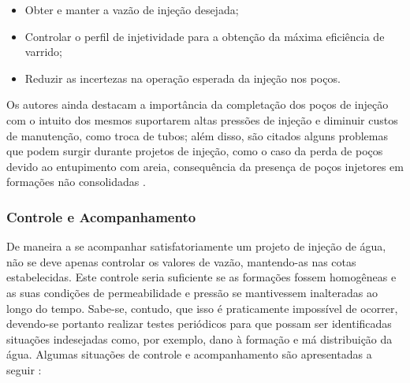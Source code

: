 \begin{itemize}
	\item Obter e manter a vaz\~{a}o de inje\c{c}\~{a}o desejada;
	\item Controlar o perfil de injetividade para a obten\c{c}\~{a}o da m\'{a}xima efici\^{e}ncia de varrido;
	\item Reduzir as incertezas na opera\c{c}\~{a}o esperada da inje\c{c}\~{a}o nos po\c{c}os.
\end{itemize}

Os autores ainda destacam a import\^{a}ncia da completa\c{c}\~{a}o dos po\c{c}os de inje\c{c}\~{a}o com o intuito dos mesmos suportarem altas press\~{o}es de inje\c{c}\~{a}o e diminuir custos de manuten\c{c}\~{a}o, como troca de tubos; al\'{e}m disso, s\~{a}o citados alguns problemas que podem surgir durante projetos de inje\c{c}\~{a}o, como o caso da perda de po\c{c}os devido ao entupimento com areia, consequ\^{e}ncia da presen\c{c}a de po\c{c}os injetores em forma\c{c}\~{o}es n\~{a}o consolidadas \cite{PALSSON2003333}. 

\subsubsection{Controle e Acompanhamento}
De maneira a se acompanhar satisfatoriamente um projeto de inje\c{c}\~{a}o de \'{a}gua, n\~{a}o se deve apenas controlar os valores de vaz\~{a}o, mantendo-as nas cotas estabelecidas. Este controle seria suficiente se as forma\c{c}\~{o}es fossem homog\^{e}neas e as suas condi\c{c}\~{o}es de permeabilidade e press\~{a}o se mantivessem inalteradas ao longo do tempo. Sabe-se, contudo, que isso \'{e} praticamente imposs\'{i}vel de ocorrer, devendo-se portanto realizar testes peri\'{o}dicos para que possam ser identificadas situa\c{c}\~{o}es indesejadas como, por exemplo, dano \`{a} forma\c{c}\~{a}o e m\'{a} distribui\c{c}\~{a}o da \'{a}gua. Algumas situa\c{c}\~{o}es de controle e acompanhamento s\~{a}o apresentadas a seguir \cite[pp. 659-662]{engres}:

